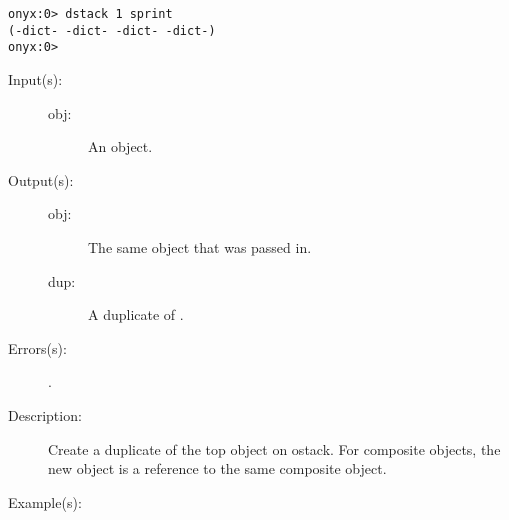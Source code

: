 \begin{description}
\begin{description}
\begin{verbatim}
onyx:0> dstack 1 sprint
(-dict- -dict- -dict- -dict-)
onyx:0>
		\end{verbatim}
	\end{description}
\label{systemdict:dup}
\item[{\onyxop{obj}{dup}{obj dup}}: ]
	\begin{description}\item[]
	\item[Input(s): ]
		\begin{description}\item[]
		\item[obj: ]
			An object.
		\end{description}
	\item[Output(s): ]
		\begin{description}\item[]
		\item[obj: ]
			The same object that was passed in.
		\item[dup: ]
			A duplicate of .
		\end{description}
	\item[Errors(s): ]
		\begin{description}\item[]
		\item[.]
		\end{description}
	\item[Description: ]
		Create a duplicate of the top object on ostack.  For composite
		objects, the new object is a reference to the same composite
		object.
	\item[Example(s): ]\begin{verbatim}


\end{verbatim}
\end{description}
\end{description}
